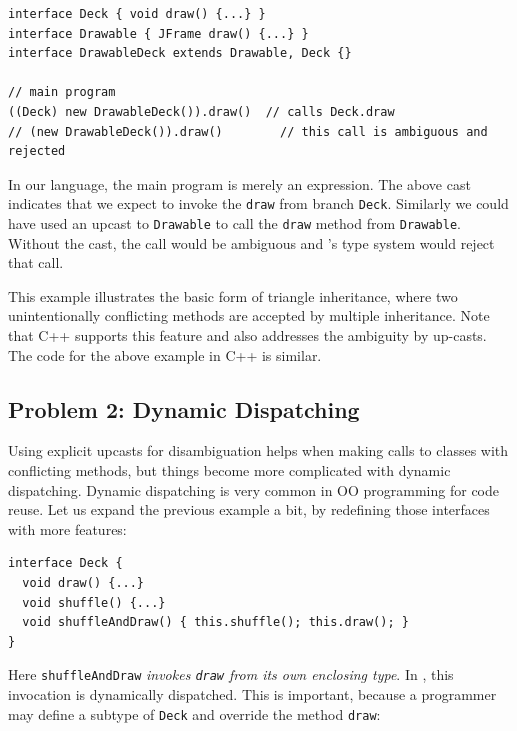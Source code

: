 \vspace{3pt}\begin{lstlisting}
interface Deck { void draw() {...} }
interface Drawable { JFrame draw() {...} }
interface DrawableDeck extends Drawable, Deck {}

// main program
((Deck) new DrawableDeck()).draw()  // calls Deck.draw
// (new DrawableDeck()).draw()        // this call is ambiguous and rejected
\end{lstlisting}\vspace{3pt}
In our language, the main program is merely an expression. The above cast indicates
that we expect to invoke the \lstinline|draw| from branch
\lstinline|Deck|. Similarly we could have used an upcast to \lstinline|Drawable|
to call the \lstinline|draw| method from \lstinline|Drawable|.
Without the cast, the call would be ambiguous and
\MIM{}'s type system would reject that call. 

This example illustrates the basic form of triangle inheritance, where two unintentionally conflicting methods
are accepted by multiple inheritance. Note that C++ supports this feature and also addresses the
ambiguity by up-casts. The code for the above example in C++ is similar. 


\subsection{Problem 2: Dynamic Dispatching}\label{subsec:problem2}
Using explicit upcasts for disambiguation helps when making calls to
classes with conflicting methods, but things
become more complicated with dynamic dispatching. Dynamic
dispatching is very common in OO programming for code reuse. Let us expand the previous
example a bit, by redefining those interfaces with more features:

\vspace{3pt}\begin{lstlisting}
interface Deck {
  void draw() {...}
  void shuffle() {...}
  void shuffleAndDraw() { this.shuffle(); this.draw(); }
}
\end{lstlisting}\vspace{3pt}
Here \lstinline|shuffleAndDraw| \emph{invokes \lstinline|draw| from its own enclosing type}. In \MIM{}, this invocation is dynamically dispatched. This is important, because a programmer may define a subtype
of \lstinline|Deck| and override the method \lstinline|draw|:

